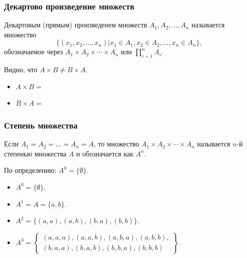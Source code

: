 \begin{frame}
    \frametitle{Декартово произведение множеств}

    \begin{definition}
        \alert{Декартовым} (прямым) произведенем множеств $A_1,A_2,\ldots,A_n$ называется множество 
        \[\{(x_1,x_2,\ldots,x_n)|x_1\in A_1,x_2\in A_2,\ldots,x_n\in A_n\},\]
        обозначаемое через $A_1\times A_2\times\cdots\times A_n$ или $\displaystyle\prod_{i=1}^{n}A_i$.
    \end{definition}

    Видно, что $A\times B\neq B\times A$. 
    \begin{example}[Произведение $A=\{a,b\}$ и $B=\{1,2\}$]
        \begin{itemize}
            \item $A\times B=$
            \item $B\times A=$
        \end{itemize}
    \end{example}
\end{frame}

\begin{frame}
    \frametitle{Степень множества}
    
    \begin{definition}
        Если $A_1=A_2=\ldots=A_n=A$, то множество $A_1\times A_2\times\cdots\times A_n$ называется $n$-й \alert{степенью} множества $A$ и обозначается как $A^n$. 
    \end{definition}
    
    По определению: $A^0=\{\emptyset\}$.
    \begin{example}[Степени $A=\{a,b\}$]
        \begin{itemize}
            \item $A^0=\{\emptyset\}$.
            \item $A^1=A=\{a,b\}$.
            \item $A^2=\{(a,a),(a,b),(b,a),(b,b)\}$.
            \item             
                \(A^3=\left\{
                    \begin{array}{c}
                        (a,a,a),(a,a,b),(a,b,a),(a,b,b),\\
                        (b,a,a),(b,a,b),(b,b,a),(b,b,b)
                    \end{array}
                    \right\}.
                \)
        \end{itemize}
    \end{example}    
\end{frame}


